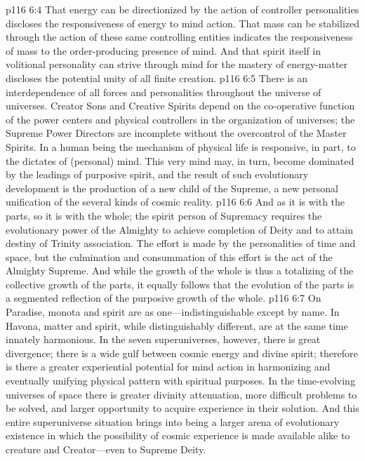 \pc \vs p116 6:4 That energy can be directionized by the action of controller personalities discloses the responsiveness of energy to mind action. That mass can be stabilized through the action of these same controlling entities indicates the responsiveness of mass to the order\hyp{}producing presence of mind. And that spirit itself in volitional personality can strive through mind for the mastery of energy\hyp{}matter discloses the potential unity of all finite creation.
\vs p116 6:5 There is an interdependence of all forces and personalities throughout the universe of universes. Creator Sons and Creative Spirits depend on the co\hyp{}operative function of the power centers and physical controllers in the organization of universes; the Supreme Power Directors are incomplete without the overcontrol of the Master Spirits. In a human being the mechanism of physical life is responsive, in part, to the dictates of (personal) mind. This very mind may, in turn, become dominated by the leadings of purposive spirit, and the result of such evolutionary development is the production of a new child of the Supreme, a new personal unification of the several kinds of cosmic reality.
\vs p116 6:6 And as it is with the parts, so it is with the whole; the spirit person of Supremacy requires the evolutionary power of the Almighty to achieve completion of Deity and to attain destiny of Trinity association. The effort is made by the personalities of time and space, but the culmination and consummation of this effort is the act of the Almighty Supreme. And while the growth of the whole is thus a totalizing of the collective growth of the parts, it equally follows that the evolution of the parts is a segmented reflection of the purposive growth of the whole.
\vs p116 6:7 On Paradise, monota and spirit are as one---indistinguishable except by name. In Havona, matter and spirit, while distinguishably different, are at the same time innately harmonious. In the seven superuniverses, however, there is great divergence; there is a wide gulf between cosmic energy and divine spirit; therefore is there a greater experiential potential for mind action in harmonizing and eventually unifying physical pattern with spiritual purposes. In the time\hyp{}evolving universes of space there is greater divinity attenuation, more difficult problems to be solved, and larger opportunity to acquire experience in their solution. And this entire superuniverse situation brings into being a larger arena of evolutionary existence in which the possibility of cosmic experience is made available alike to creature and Creator---even to Supreme Deity.
